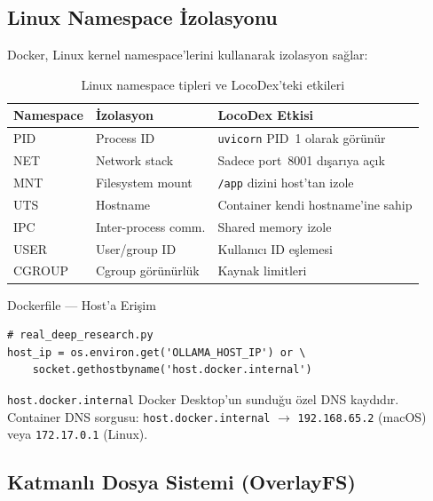 \subsection{Linux Namespace \.{I}zolasyonu}
\label{sec:namespaces}

Docker, Linux kernel namespace'lerini kullanarak izolasyon sa\u{g}lar:

\begin{table}[H]
\centering
\caption{Linux namespace tipleri ve LocoDex'teki etkileri}
\label{tab:namespaces}
\begin{tabularx}{\textwidth}{llX}
\toprule
\color{chapterBlue}\textbf{Namespace} & \color{chapterBlue}\textbf{\.{I}zolasyon} & \color{chapterBlue}\textbf{LocoDex Etkisi} \\
\midrule
PID    & Process ID          & \texttt{uvicorn} PID~1 olarak g\"{o}r\"{u}n\"{u}r \\
NET    & Network stack       & Sadece port~8001 d{\i}\c{s}ar{\i}ya a\c{c}{\i}k \\
MNT    & Filesystem mount    & \texttt{/app} dizini host'tan izole \\
UTS    & Hostname            & Container kendi hostname'ine sahip \\
IPC    & Inter-process comm. & Shared memory izole \\
USER   & User/group ID       & Kullan{\i}c{\i} ID e\c{s}lemesi \\
CGROUP & Cgroup g\"{o}r\"{u}n\"{u}rl\"{u}k  & Kaynak limitleri \\
\bottomrule
\end{tabularx}
\end{table}

\begin{kodref}{Dockerfile --- Host'a Eri\c{s}im}
\begin{lstlisting}
# real_deep_research.py
host_ip = os.environ.get('OLLAMA_HOST_IP') or \
    socket.gethostbyname('host.docker.internal')
\end{lstlisting}
\texttt{host.docker.internal} Docker Desktop'un sundu\u{g}u \"{o}zel DNS kayd{\i}d{\i}r.
Container DNS sorgusu: \texttt{host.docker.internal} $\to$ \texttt{192.168.65.2} (macOS) veya \texttt{172.17.0.1} (Linux).
\end{kodref}

\subsection{Katmanl{\i} Dosya Sistemi (OverlayFS)}
\label{sec:overlayfs}

